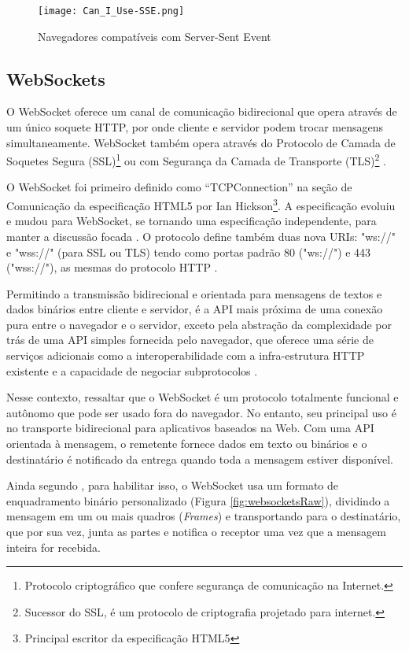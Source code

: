 \begin{figure}[!htb]
	\centering
	\caption{Navegadores compatíveis com Server-Sent Event}
	\texttt{[image: Can\_I\_Use-SSE.png]}
	\label{fig:sse}
\end{figure}

\subsection{WebSockets}

O WebSocket oferece um canal de comunicação bidirecional que opera através de um único soquete HTTP, por onde cliente e servidor podem trocar mensagens simultaneamente. WebSocket também opera através do Protocolo de Camada de Soquetes Segura (SSL)\footnote{Protocolo criptográfico que confere segurança de comunicação na Internet.} ou com Segurança da Camada de Transporte (TLS)\footnote{Sucessor do SSL, é um protocolo de criptografia projetado para internet.} \cite{lombardi2015websocket}.

O WebSocket foi primeiro definido como “TCPConnection” na seção de Comunicação da especificação HTML5 por Ian Hickson\footnote{Principal escritor da especificação HTML5}. A especificação evoluiu e mudou para WebSocket, se tornando uma especificação independente, para manter a discussão focada \cite{lubbers2011pro}. O protocolo define também duas nova URIs: "ws://" e "wss://" (para SSL ou TLS) tendo como portas padrão 80 ("ws://") e 443 ("wss://"), as mesmas do protocolo HTTP \cite{Saint-Andre2011}.

Permitindo a transmissão bidirecional e orientada para mensagens de textos e dados binários entre cliente e servidor, é a API mais próxima de uma conexão pura entre o navegador e o servidor, exceto pela abstração da complexidade por trás de uma API simples fornecida pelo navegador, que oferece uma série de serviços adicionais como a interoperabilidade com a infra-estrutura HTTP existente e a capacidade de negociar subprotocolos \cite{grigorik2013high}.

Nesse contexto,  ressaltar que o WebSocket é um protocolo totalmente funcional e autônomo que pode ser usado fora do navegador. No entanto, seu principal uso é no transporte bidirecional para aplicativos baseados na Web. Com uma API orientada à mensagem, o remetente fornece dados em texto ou binários e o destinatário é notificado da entrega quando toda a mensagem estiver disponível.

Ainda segundo , para habilitar isso, o WebSocket usa um formato de enquadramento binário personalizado (Figura \ref{fig:websocketsRaw}), dividindo a mensagem em um ou mais quadros (\emph{Frames}) e transportando para o destinatário, que por sua vez, junta as partes e notifica o receptor uma vez que a mensagem inteira for recebida.

